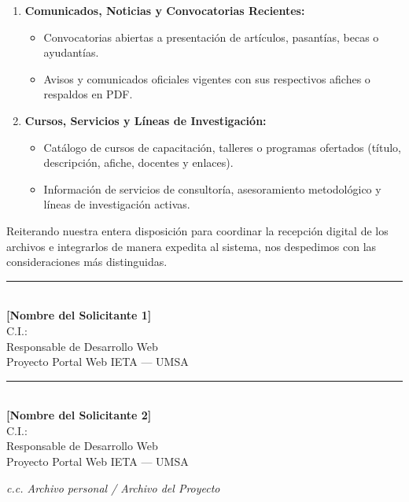 \documentclass[11pt,letterpaper]{article}
\begin{document}
\begin{enumerate}[label=\textbf{\color{ietaBlue}\arabic*.}, leftmargin=1.5em]
    \item \textbf{Comunicados, Noticias y Convocatorias Recientes:}
    \begin{itemize}[leftmargin=1.2em, itemsep=2pt]
        \item Convocatorias abiertas a presentación de artículos, pasantías, becas o ayudantías.
        \item Avisos y comunicados oficiales vigentes con sus respectivos afiches o respaldos en PDF.
    \end{itemize}

    \item \textbf{Cursos, Servicios y Líneas de Investigación:}
    \begin{itemize}[leftmargin=1.2em, itemsep=2pt]
        \item Catálogo de cursos de capacitación, talleres o programas ofertados (título, descripción, afiche, docentes y enlaces).
        \item Información de servicios de consultoría, asesoramiento metodológico y líneas de investigación activas.
    \end{itemize}
\end{enumerate}

Reiterando nuestra entera disposición para coordinar la recepción digital de los archivos e integrarlos de manera expedita al sistema, nos despedimos con las consideraciones más distinguidas.

\vspace{1.8cm}

\noindent
\begin{minipage}[t]{0.48\textwidth}
    \centering
    \rule{6.5cm}{0.6pt}\\[4pt]
    \textbf{[Nombre del Solicitante 1]}\\[2pt]
    \small C.I.: \underline{\hspace{3.5cm}}\\[2pt]
    \footnotesize Responsable de Desarrollo Web \\
    Proyecto Portal Web IETA --- UMSA
\end{minipage}
\hfill
\begin{minipage}[t]{0.48\textwidth}
    \centering
    \rule{6.5cm}{0.6pt}\\[4pt]
    \textbf{[Nombre del Solicitante 2]}\\[2pt]
    \small C.I.: \underline{\hspace{3.5cm}}\\[2pt]
    \footnotesize Responsable de Desarrollo Web \\
    Proyecto Portal Web IETA --- UMSA
\end{minipage}

\vspace{1.5cm}
\footnotesize \textit{c.c. Archivo personal / Archivo del Proyecto}
\end{document}
